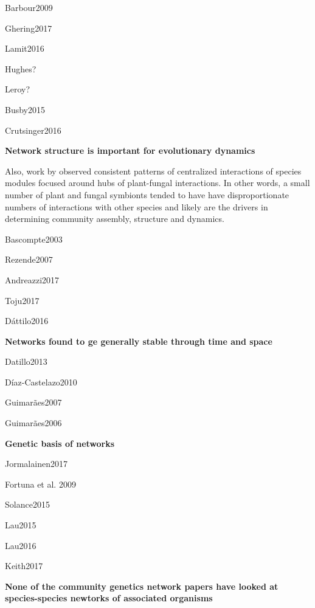 \documentclass[fleqn,10pt]{wlscirep}
\begin{document}
\cite{Thompson1999, Rowntree2011, DesRoches2017}
\citep{Ellison2005}
\cite{Martinsen2001}
\cite{Lamit2011}

Barbour2009

Ghering2017 

Lamit2016

Hughes?

Leroy?

Busby2015

Crutsinger2016

\textbf{Network structure is important for evolutionary dynamics}

\cite{Rezende2007, Guimaraes2011, Moya-Larano2011, Thompson2014, Fortin2017}


Also, work by \citep{Toju 2018, Toju2015, Toju2014} observed
consistent patterns of centralized interactions of species modules
focused around hubs of plant-fungal interactions. In other words, a
small number of plant and fungal symbionts tended to have have
disproportionate numbers of interactions with other species and likely
are the drivers in determining community assembly, structure and
dynamics.

Bascompte2003

Rezende2007

Andreazzi2017

Toju2017

Dáttilo2016

\textbf{Networks found to ge generally stable through time and space}

Datillo2013

Díaz-Castelazo2010

Guimarães2007

Guimarães2006


\textbf{Genetic basis of networks}

Jormalainen2017

Fortuna et al. 2009

Solance2015

Lau2015

Lau2016

Keith2017


\textbf{None of the community genetics network papers have looked at
species-species newtorks of associated organisms}
\end{document}
